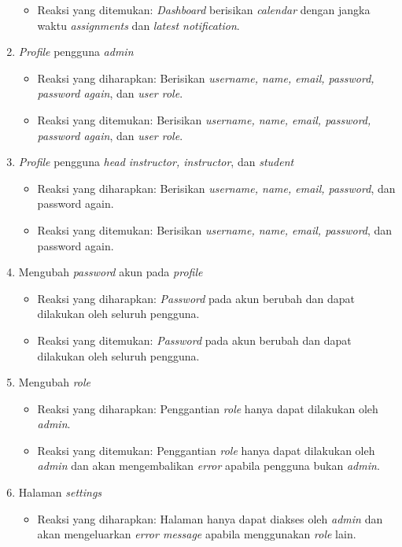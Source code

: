 \begin{enumerate}
\begin{itemize}
	 	\item Reaksi yang ditemukan: \textit{Dashboard} berisikan \textit{calendar} dengan jangka waktu \textit{assignments} dan \textit{latest notification}.
	 \end{itemize}
	 \item \textit{Profile} pengguna \textit{admin}
	 \begin{itemize}
	 	\item Reaksi yang diharapkan: Berisikan \textit{username, name, email, password, password again}, dan \textit{user role}.
	 	\item Reaksi yang ditemukan: Berisikan \textit{username, name, email, password, password again}, dan \textit{user role}.
	 \end{itemize}
	 \item \textit{Profile} pengguna \textit{head instructor, instructor}, dan \textit{student}
	 \begin{itemize}
	 	\item Reaksi yang diharapkan: Berisikan \textit{username, name, email, password}, dan password again.
	 	\item Reaksi yang ditemukan: Berisikan \textit{username, name, email, password}, dan password again.
	 \end{itemize}
	 \item Mengubah \textit{password} akun pada \textit{profile}
	 \begin{itemize}
	 	\item Reaksi yang diharapkan: \textit{Password} pada akun berubah dan dapat dilakukan oleh seluruh pengguna.
	 	\item Reaksi yang ditemukan: \textit{Password} pada akun berubah dan dapat dilakukan oleh seluruh pengguna.
	 \end{itemize}
	 \item Mengubah \textit{role}
	 \begin{itemize}
	 	\item Reaksi yang diharapkan: Penggantian \textit{role} hanya dapat dilakukan oleh \textit{admin}.
	 	\item Reaksi yang ditemukan: Penggantian \textit{role} hanya dapat dilakukan oleh \textit{admin} dan akan mengembalikan \textit{error} apabila pengguna bukan \textit{admin}.
	 \end{itemize}
	 \item Halaman \textit{settings}
	 \begin{itemize}
	 	\item Reaksi yang diharapkan: Halaman hanya dapat diakses oleh \textit{admin} dan akan mengeluarkan \textit{error message} apabila menggunakan \textit{role} lain.

\end{itemize}
\end{enumerate}
